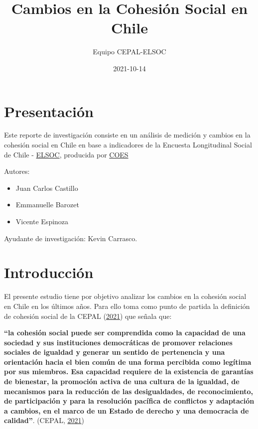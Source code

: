 \documentclass[
  12pt,
]{book}
\title{Cambios en la Cohesión Social en Chile}
\author{Equipo CEPAL-ELSOC}
\date{2021-10-14}
\providecommand{\tightlist}{%
  \setlength{\itemsep}{0pt}\setlength{\parskip}{0pt}}
\begin{document}
\maketitle

{
\hypersetup{linkcolor=}
\setcounter{tocdepth}{1}
\tableofcontents
}
\listoftables
\listoffigures
{}
\hypertarget{presentaciuxf3n}{%
\chapter*{Presentación}\label{presentaciuxf3n}}

Este reporte de investigación consiste en un análisis de medición y cambios en la cohesión social en Chile en base a indicadores de la Encuesta Longitudinal Social de Chile - \href{https://coes.cl/encuesta-panel/}{ELSOC}, producida por \href{https://coes.cl/}{COES}

Autores:

\begin{itemize}
\tightlist
\item
  Juan Carlos Castillo
\item
  Emmanuelle Barozet
\item
  Vicente Espinoza
\end{itemize}

Ayudante de investigación: Kevin Carrasco.

\hypertarget{introducciuxf3n}{%
\chapter*{Introducción}\label{introducciuxf3n}}

El presente estudio tiene por objetivo analizar los cambios en la cohesión social en Chile en los últimos años. Para ello toma como punto de partida la definición de cohesión social de la CEPAL (\protect\hyperlink{ref-cepal_cohesion_2021}{2021}) que señala que:

\textbf{``la cohesión social puede ser comprendida como la capacidad de una sociedad y sus instituciones democráticas de promover relaciones sociales de igualdad y generar un sentido de pertenencia y una orientación hacia el bien común de una forma percibida como legítima por sus miembros. Esa capacidad requiere de la existencia de garantías de bienestar, la promoción activa de una cultura de la igualdad, de mecanismos para la reducción de las desigualdades, de reconocimiento, de participación y para la resolución pacífica de conflictos y adaptación a cambios, en el marco de un Estado de derecho y una democracia de calidad''}. (CEPAL, \protect\hyperlink{ref-cepal_cohesion_2021}{2021})
\end{document}

